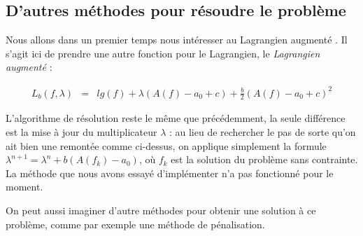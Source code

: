 \documentclass[10pt,a4paper]{article}
\theoremstyle{plain}
\theoremstyle{definition}
\begin{document}
\subsection{D'autres méthodes pour résoudre le problème}

Nous allons dans un premier temps nous intéresser au Lagrangien augmenté \cite{cohen00}. Il s'agit ici de prendre une autre fonction pour le Lagrangien, le \emph{Lagrangien augmenté} :

\begin{eqnarray*}
L_b(f,\lambda)&=& lg(f) + \lambda\left(A(f)-a_0 + c\right) + \frac{b}{2}\left(A(f)-a_0+c\right)^2
\end{eqnarray*}

L'algorithme de résolution reste le même que précédemment, la seule différence est la mise à jour du multiplicateur $\lambda$ : au lieu de rechercher le pas de sorte qu'on ait bien une remontée comme ci-dessus, on applique simplement la formule $\lambda^{n+1} = \lambda^n+b(A(f_k)-a_0)$, où $f_k$ est la solution du problème sans contrainte. La méthode que nous avons essayé d'implémenter n'a pas fonctionné pour le moment.

On peut aussi imaginer d'autre méthodes pour obtenir une solution à ce problème, comme par exemple une méthode de pénalisation.




\end{document}
